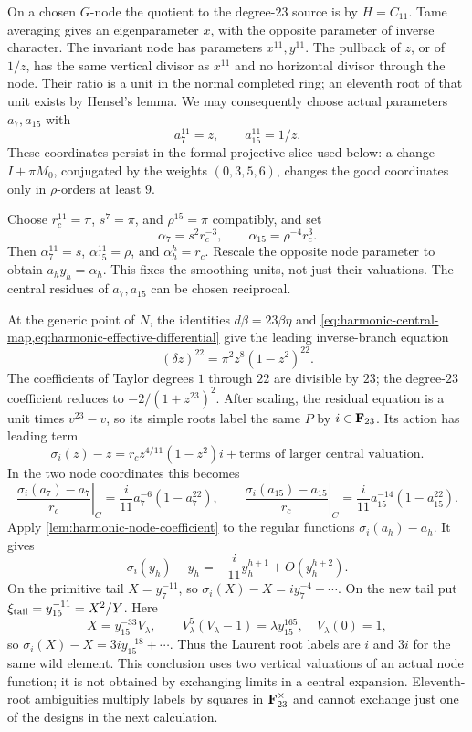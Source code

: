 On a chosen $G$-node the quotient to the degree-$23$ source is by
$H=C_{11}$.  Tame averaging gives an eigenparameter $x$, with the
opposite parameter of inverse character.  The invariant node has
parameters $x^{11},y^{11}$.  The pullback of $z$, or of $1/z$, has
the same vertical divisor as $x^{11}$ and no horizontal divisor
through the node.  Their ratio is a unit in the normal completed
ring; an eleventh root of that unit exists by Hensel's lemma.
We may consequently choose actual parameters $a_7,a_{15}$ with
\[
 a_7^{11}=z,\qquad a_{15}^{11}=1/z.
\]
These coordinates persist in the formal projective slice used below:
a change $I+\pi M_0$, conjugated by the weights $(0,3,5,6)$, changes
the good coordinates only in $\rho$-orders at least $9$.

Choose $r_c^{11}=\pi$, $s^7=\pi$, and $\rho^{15}=\pi$ compatibly,
and set
\[
 \alpha_7=s^2r_c^{-3},\qquad \alpha_{15}=\rho^{-4}r_c^3.
\]
Then $\alpha_7^{11}=s$, $\alpha_{15}^{11}=\rho$, and
$\alpha_h^h=r_c$.  Rescale the opposite node parameter to obtain
$a_hy_h=\alpha_h$.  This fixes the smoothing units, not just their
valuations.  The central residues of $a_7,a_{15}$ can be chosen
reciprocal.

At the generic point of $N$, the identities
$d\beta=23\beta\eta$ and \cref{eq:harmonic-central-map,eq:harmonic-effective-differential}
give the leading inverse-branch equation
\[
 (\delta z)^{22}=\pi^2z^8(1-z^2)^{22}.
\]
The coefficients of Taylor degrees $1$ through $22$ are divisible
by $23$; the degree-$23$ coefficient reduces to
$-2/(1+z^{23})^2$.  After scaling, the residual equation is a unit
times $v^{23}-v$, so its simple roots label the same $P$ by
$i\in\mathbf F_{23}$.  Its action has leading term
\[
 \sigma_i(z)-z=r_cz^{4/11}(1-z^2)i
       +\text{terms of larger central valuation}.
\]
In the two node coordinates this becomes
\[
 \left.\frac{\sigma_i(a_7)-a_7}{r_c}\right|_C
   =\frac{i}{11}a_7^{-6}(1-a_7^{22}),\qquad
 \left.\frac{\sigma_i(a_{15})-a_{15}}{r_c}\right|_C
   =\frac{i}{11}a_{15}^{-14}(1-a_{15}^{22}).
\]
Apply \cref{lem:harmonic-node-coefficient} to the regular functions
$\sigma_i(a_h)-a_h$.  It gives
\[
 \sigma_i(y_h)-y_h=-\frac{i}{11}y_h^{h+1}+O(y_h^{h+2}).
\]
On the primitive tail $X=y_7^{-11}$, so
$\sigma_i(X)-X=i y_7^{-4}+\cdots$.
On the new tail put $\xi_{\rm tail}=y_{15}^{-11}=X^2/Y$.
Here
\[
 X=y_{15}^{-33}V_\lambda,\qquad
 V_\lambda^5(V_\lambda-1)=\lambda y_{15}^{165},\quad V_\lambda(0)=1,
\]
so $\sigma_i(X)-X=3i y_{15}^{-18}+\cdots$.
Thus the Laurent root labels are $i$ and $3i$ for the same wild
element.  This conclusion uses two vertical valuations of an actual
node function; it is not obtained by exchanging limits in a central
expansion.  Eleventh-root ambiguities multiply labels by squares
in $\mathbf F_{23}^{\times}$ and cannot exchange just one of the designs
in the next calculation.


